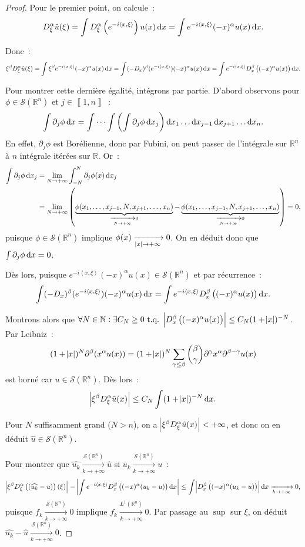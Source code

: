 \documentclass{report}
\newcommand{\R}{{\mathbb R}}
\newcommand{\N}{{\mathbb N}}
\newcommand{\scpr}[2]{\left\langle#1, #2\right\rangle}
\newcommand{\tq}{\text{ t.q. }}
\newcommand{\pinfty}{{+\infty}}
\newcommand{\intint}[2]{{\left\llbracket#1, #2\right\rrbracket}}
\newcommand{\dx}{\dif x}
\theoremstyle{definition}
\theoremstyle{remark}
\begin{document}
\begin{proof} Pour le premier point, on calcule~:
\[D^\alpha_\xi\hat u(\xi) = \int D^\alpha_\xi\left(e^{-i\scpr x\xi}\right)u(x)\dif x = \int e^{-i\scpr x\xi}(-x)^\alpha u(x)\dif x.\]

Donc~:
\[\xi^\beta D^\alpha_\xi\hat u(\xi) = \int \xi^\beta e^{-i\scpr x\xi}(-x)^\alpha u(x)\dif x = \int (-D_x)^\beta(e^{-i\scpr x\xi})(-x)^\alpha u(x)\dif x
	= \int e^{-i\scpr x\xi} D^\beta_x\left((-x)^\alpha u(x)\right)\dif x.\]

Pour montrer cette dernière égalité, intégrons par partie. D'abord observons pour $\phi \in \mathcal S(\R^n)$ et $j \in \intint 1n$~:
\[\int \partial_j\phi\dx = \idotsint\left(\int \partial_j\phi\dx_j\right)\dx_1\ldots\dx_{j-1}\dx_{j+1}\ldots\dx_n.\]
En effet, $\partial_j\phi$ est Borélienne, donc par Fubini, on peut passer de l'intégrale sur $\R^n$ à $n$ intégrale itérées sur $\R$. Or~:
\begin{align*}
	\int \partial_j\phi\dx_j &= \lim_{N \to \pinfty}\int_{-N}^N\partial_j\phi(x)\dx_j \\
	&= \lim_{N \to \pinfty}\left(\underbrace {\phi(x_1, \ldots, x_{j-1}, N, x_{j+1}, \ldots, x_n)}_{\xrightarrow[N \to \pinfty]{} 0}
			- \underbrace {\phi(x_1, \ldots, x_{j-1}, N, x_{j+1}, \ldots, x_n)}_{\xrightarrow[N \to \pinfty]{} 0}\right) = 0,
\end{align*}
puisque $\phi \in \mathcal S(\R^n)$ implique $\phi(x) \xrightarrow[\abs x \to \pinfty]{} 0$. On en déduit donc que $\int\partial_j\phi\dx = 0$.

Dès lors, puisque $e^{-i\scpr x\xi}(-x)^\alpha u(x) \in \mathcal S(\R^n)$ et par récurrence~:
\[\int (-D_x)^\beta(e^{-i\scpr x\xi})(-x)^\alpha u(x)\dif x	= \int e^{-i\scpr x\xi} D^\beta_x\left((-x)^\alpha u(x)\right)\dif x.\]

Montrons alors que $\forall N \in \N : \exists C_N \geq 0 \tq \abs {D_x^\beta\left((-x)^\alpha u(x)\right)} \leq C_N(1 + \abs x)^{-N}$. Par Leibniz~:
\[(1 + \abs x)^N\partial^\beta (x^\alpha u(x)) = (1 + \abs x)^N\sum_{\gamma \leq \beta} \binom \beta\gamma\partial^\gamma x^\alpha\partial^{\beta-\gamma}u(x)\]
est borné car $u \in \mathcal S(\R^n)$. Dès lors~:
\[\abs {\xi^\beta D_\xi^\alpha \hat u(x)} \leq C_N\int(1 + \abs x)^{-N}\dx.\]

Pour $N$ suffisamment grand ($N > n$), on a $\abs {\xi^\beta D_\xi^\alpha \hat u(x)} < \pinfty$, et donc on en déduit $\hat u \in \mathcal S(\R^n)$.

Pour montrer que $\widehat {u_k} \xrightarrow[k \to \pinfty]{\mathcal S(\R^n)} \hat u$ si $u_k \xrightarrow[k \to \pinfty]{\mathcal S(\R^n)} u$~:
\[\abs {\xi^\beta D_\xi^\alpha\left((\widehat {u_k} - u)\right)(\xi)} = \abs {\int e^{-i\scpr x\xi}D_x^\beta\left((-x)^\alpha(u_k-u)\right)\dif x}
	\leq \int\abs {D_x^\beta\left((-x)^\alpha(u_k-u)\right)}\dif x \xrightarrow[k \to \pinfty]{} 0,\]
puisque $f_k \xrightarrow[k \to \pinfty]{\mathcal S(\R^n)} 0$ implique $f_k \xrightarrow[k \to \pinfty]{L^1(\R^n)} 0$. Par passage au $\sup$ sur $\xi$, on
déduit $\widehat {u_k} - \hat u \xrightarrow[k \to \pinfty]{\mathcal S(\R^n)} 0$.


\end{proof}
\end{document}
